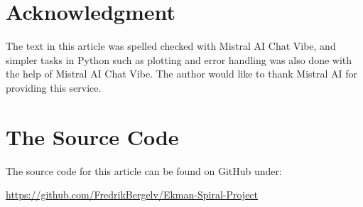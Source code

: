 
\section*{Acknowledgment}
The text in this article was spelled checked with Mistral AI Chat Vibe, and simpler tasks in Python such as plotting and error handling was also done with the help of Mistral AI Chat Vibe. The author would like to thank Mistral AI for providing this service.

\appendix
\section{The Source Code}
The source code for this article can be found on GitHub under:
\begin{center}
\url{https://github.com/FredrikBergelv/Ekman-Spiral-Project}
\end{center}



